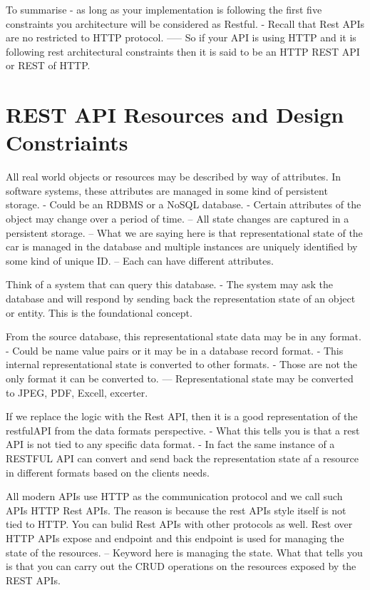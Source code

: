 \documentclass[a4paper, 11pt]{book}
\begin{document}
    To summarise - as long as your implementation is following the first five constraints you architecture will be considered as Restful.
    - Recall that Rest APIs are no restricted to HTTP protocol.
    ----- So if your API is using HTTP and it is following rest architectural constraints then it is said to be an HTTP REST API or REST of HTTP.


    \section{REST API Resources and Design Constriaints}
    All real world objects or resources may be described by way of attributes.
    In software systems, these attributes are managed in some kind of persistent storage.
    - Could be an RDBMS or a NoSQL database.
    - Certain attributes of the object may change over a period of time.
    -- All state changes are captured in a persistent storage.
    -- What we are saying here is that representational state of the car is managed in the database and multiple instances are uniquely identified by some kind of unique ID.
    -- Each can have different attributes.

    Think of a system that can query this database.
    - The system may ask the database and will respond by sending back the representation state of an object or entity.
    This is the foundational concept.

    From the source database, this representational state data may be in any format.
    - Could be name value pairs or it may be in a database record format.
    - This internal representational state is converted to other formats.
    - Those are not the only format it can be converted to.
    --- Representational state may be converted to JPEG, PDF, Excell, excerter.

    If we replace the logic with the Rest API, then it is a good representation of the restfulAPI from the data formats perspective.
    - What this tells you is that a rest API is not tied to any specific data format.
    - In fact the same instance of a RESTFUL API can convert and send back the representation state af a resource in different formats based on the clients needs.

    All modern APIs use HTTP as the communication protocol and we call such APIs HTTP Rest APIs.
    The reason is because the rest APIs style itself is not tied to HTTP.
    You can bulid Rest APIs with other protocols as well.
    Rest over HTTP APIs expose and endpoint and this endpoint is used for managing the state of the resources.
    -- Keyword here is managing the state.
    What that tells you is that you can carry out the CRUD operations on the resources exposed by the REST APIs.
\end{document}
